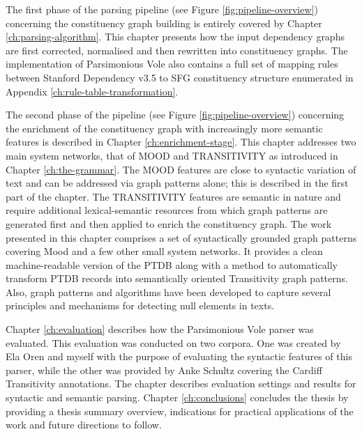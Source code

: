     The first phase of the parsing pipeline (see Figure \ref{fig:pipeline-overview}) concerning the constituency graph building is entirely covered by Chapter \ref{ch:parsing-algorithm}. This chapter presents how the input dependency graphs are first corrected, normalised and then rewritten into constituency graphs. The implementation of Parsimonious Vole also contains a full set of mapping rules between Stanford Dependency v3.5 to SFG constituency structure enumerated in Appendix \ref{ch:rule-table-transformation}.

    
    The second phase of the pipeline (see Figure \ref{fig:pipeline-overview}) concerning the enrichment of the constituency graph with increasingly more semantic features is described in Chapter \ref{ch:enrichment-stage}. This chapter addresses two main system networks, that of MOOD and TRANSITIVITY as introduced in Chapter \ref{ch:the-grammar}. The MOOD features are close to syntactic variation of text and can be addressed via graph patterns alone; this is described in the first part of the chapter. The TRANSITIVITY features are semantic in nature and require additional lexical-semantic resources from which graph patterns are generated first and then applied to enrich the constituency graph. The work presented in this chapter comprises a set of syntactically grounded graph patterns covering Mood and a few other small system networks. It provides a clean machine-readable version of the PTDB along with a method to automatically transform PTDB records into semantically oriented Transitivity graph patterns. Also, graph patterns and algorithms have been developed to capture several principles and mechanisms for detecting null elements in texts.

    Chapter \ref{ch:evaluation} describes how the Parsimonious Vole parser was evaluated. This evaluation was conducted on two corpora. One was created by Ela Oren and myself with the purpose of evaluating the syntactic features of this parser, while the other was provided by Anke Schultz covering the Cardiff Transitivity annotations. The chapter describes evaluation settings and results for syntactic and semantic parsing. Chapter \ref{ch:conclusions} concludes the thesis by providing a thesis summary overview, indications for practical applications of the work and future directions to follow. 